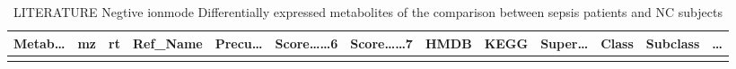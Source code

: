 \documentclass[
]{article}
\begin{document}
\begin{longtable}[]{@{}lllllllllllll@{}}
\caption{\label{tab:LITERATURE-Negtive-ionmode-Differentially-expressed-metabolites-of-the-comparison-between-sepsis-patients-and-NC-subjects}LITERATURE Negtive ionmode Differentially expressed metabolites of the comparison between sepsis patients and NC subjects}\tabularnewline
\toprule
\begin{minipage}[b]{0.05\columnwidth}\raggedright
Metab\ldots{}\strut
\end{minipage} & \begin{minipage}[b]{0.05\columnwidth}\raggedright
mz\strut
\end{minipage} & \begin{minipage}[b]{0.05\columnwidth}\raggedright
rt\strut
\end{minipage} & \begin{minipage}[b]{0.05\columnwidth}\raggedright
Ref\_Name\strut
\end{minipage} & \begin{minipage}[b]{0.05\columnwidth}\raggedright
Precu\ldots{}\strut
\end{minipage} & \begin{minipage}[b]{0.07\columnwidth}\raggedright
Score\ldots\ldots6\strut
\end{minipage} & \begin{minipage}[b]{0.07\columnwidth}\raggedright
Score\ldots\ldots7\strut
\end{minipage} & \begin{minipage}[b]{0.05\columnwidth}\raggedright
HMDB\strut
\end{minipage} & \begin{minipage}[b]{0.04\columnwidth}\raggedright
KEGG\strut
\end{minipage} & \begin{minipage}[b]{0.05\columnwidth}\raggedright
Super\ldots{}\strut
\end{minipage} & \begin{minipage}[b]{0.05\columnwidth}\raggedright
Class\strut
\end{minipage} & \begin{minipage}[b]{0.05\columnwidth}\raggedright
Subclass\strut
\end{minipage} & \begin{minipage}[b]{0.02\columnwidth}\raggedright
\ldots{}\strut
\end{minipage}\tabularnewline
\midrule
\endfirsthead
\toprule
\begin{minipage}[b]{0.05\columnwidth}\raggedright

\end{minipage}
\end{longtable}
\end{document}
